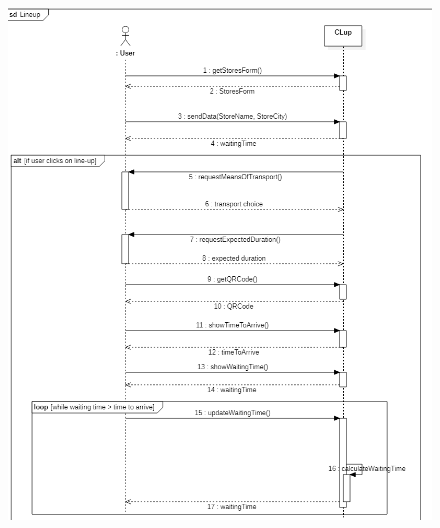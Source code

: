 \documentclass{article}
\begin{document}
\begin{figure}[H]
  \includegraphics[width=\linewidth]{LineUpSequence.png}
  
\end{figure}
\end{document}
